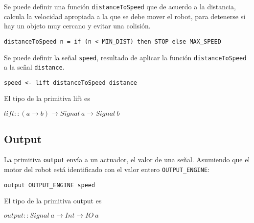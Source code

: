   Se puede definir una función \texttt{distanceToSpeed} que de acuerdo
a la distancia, calcula la velocidad apropiada a la que se debe mover
el robot, para detenerse si hay un objeto muy cercano y evitar una colisión.

\begin{center}
\begin{Verbatim}[frame=single]
distanceToSpeed n = if (n < MIN_DIST) then STOP else MAX_SPEED
\end{Verbatim}
\end{center}


  Se puede definir la señal \texttt{speed}, resultado de aplicar la
función \texttt{distanceToSpeed} a la señal \texttt{distance}.

\begin{center}
\begin{Verbatim}[frame=single]
speed <- lift distanceToSpeed distance
\end{Verbatim}
\end{center}

El tipo de la primitiva lift es

\begin{center}
  $lift :: (a \rightarrow b) \rightarrow Signal\ a \rightarrow Signal\ b$
\end{center}

\subsection{Output}
  La primitiva \texttt{output} envía a un actuador, el valor de una señal.
  Asumiendo que el motor del robot está identificado con el valor entero
\texttt{OUTPUT\_ENGINE}:

\begin{center}
\begin{Verbatim}[frame=single]
output OUTPUT_ENGINE speed
\end{Verbatim}
\end{center}

  El tipo de la primitiva output es

\begin{center}
$output :: Signal\ a \rightarrow Int \rightarrow IO\ a$
\end{center}
 
